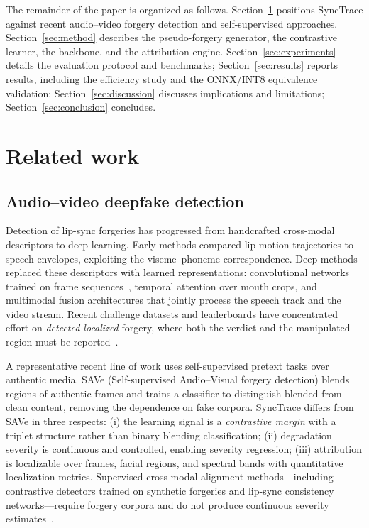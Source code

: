 \documentclass[sn-basic,Numbered,referee]{sn-jnl}
\begin{document}
The remainder of the paper is organized as follows. Section~\ref{sec:related} positions SyncTrace against recent audio--video forgery detection and self-supervised approaches. Section~\ref{sec:method} describes the pseudo-forgery generator, the contrastive learner, the backbone, and the attribution engine. Section~\ref{sec:experiments} details the evaluation protocol and benchmarks; Section~\ref{sec:results} reports results, including the efficiency study and the ONNX/INT8 equivalence validation; Section~\ref{sec:discussion} discusses implications and limitations; Section~\ref{sec:conclusion} concludes.

\section{Related work}
\label{sec:related}

\subsection{Audio--video deepfake detection}

Detection of lip-sync forgeries has progressed from handcrafted cross-modal descriptors to deep learning. Early methods compared lip motion trajectories to speech envelopes, exploiting the viseme--phoneme correspondence. Deep methods replaced these descriptors with learned representations: convolutional networks trained on frame sequences~\cite{chollet2017xception,rossler2019faceforensicspp}, temporal attention over mouth crops, and multimodal fusion architectures that jointly process the speech track and the video stream. Recent challenge datasets and leaderboards have concentrated effort on \emph{detected-localized} forgery, where both the verdict and the manipulated region must be reported~\cite{dolhansky2020deepfake}.

A representative recent line of work uses self-supervised pretext tasks over authentic media. SAVe (Self-supervised Audio--Visual forgery detection) blends regions of authentic frames and trains a classifier to distinguish blended from clean content, removing the dependence on fake corpora. SyncTrace differs from SAVe in three respects: (i) the learning signal is a \emph{contrastive margin} with a triplet structure rather than binary blending classification; (ii) degradation severity is continuous and controlled, enabling severity regression; (iii) attribution is localizable over frames, facial regions, and spectral bands with quantitative localization metrics. Supervised cross-modal alignment methods---including contrastive detectors trained on synthetic forgeries and lip-sync consistency networks---require forgery corpora and do not produce continuous severity estimates~\cite{cao2024cad,liploc2024}.
\end{document}
